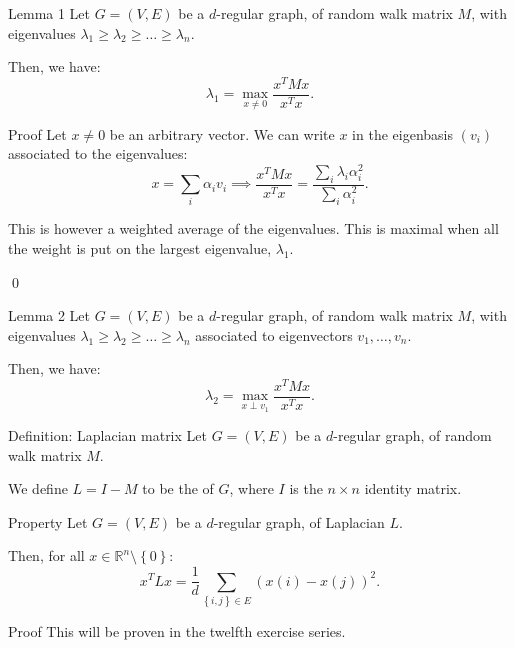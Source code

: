 \documentclass[a4paper]{article}
\begin{document}
\begin{parag}{Lemma 1}
    Let $G = \left(V, E\right)$ be a $d$-regular graph, of random walk matrix $M$, with eigenvalues $\lambda_1 \geq \lambda_2 \geq \ldots \geq \lambda_n$.

    Then, we have: 
    \[\lambda_1 = \max_{x \neq 0} \frac{x^T M x}{x^T x}.\]
    
    \begin{subparag}{Proof}
        Let $x \neq 0$ be an arbitrary vector. We can write $x$ in the eigenbasis $\left(v_i\right)$ associated to the eigenvalues:  
        \[x = \sum_{i} \alpha_i v_i \implies \frac{x^T M x}{x^T x} = \frac{\sum_{i} \lambda_i \alpha_i^2}{\sum_{i} \alpha_i^2}.\]

        This is however a weighted average of the eigenvalues. This is maximal when all the weight is put on the largest eigenvalue, $\lambda_1$.
        
        \qed
    \end{subparag}
\end{parag}

\begin{parag}{Lemma 2}
    Let $G = \left(V, E\right)$ be a $d$-regular graph, of random walk matrix $M$, with eigenvalues $\lambda_1 \geq \lambda_2 \geq \ldots \geq \lambda_n$ associated to eigenvectors $v_1, \ldots, v_n$.
    
    Then, we have: 
    \[\lambda_2 = \max_{x \perp v_1} \frac{x^T M x}{x^T x}.\]
\end{parag}

\begin{parag}{Definition: Laplacian matrix}
    Let $G = \left(V, E\right)$ be a $d$-regular graph, of random walk matrix $M$.

    We define $L = I - M$ to be the  of $G$, where $I$ is the $n \times n$ identity matrix.
\end{parag}

\begin{parag}{Property}
    Let $G = \left(V, E\right)$ be a $d$-regular graph, of Laplacian $L$.

    Then, for all $x \in \mathbb{R}^n \setminus \left\{0\right\}$: 
    \[x^T L x = \frac{1}{d} \sum_{\left\{i, j\right\} \in E} \left(x\left(i\right) - x\left(j\right)\right)^2.\]
    
    \begin{subparag}{Proof}
        This will be proven in the twelfth exercise series.
    \end{subparag}
\end{parag}
\end{document}
